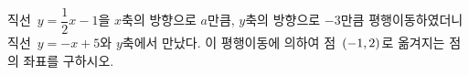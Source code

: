 직선~$y=\dfrac{1}{2}x-1$을 $x$축의 방향으로 $a$만큼, $y$축의 방향으로 $-3$만큼 평행이동하였더니 직선~$y=-x+5$와 $y$축에서 만났다. 이 평행이동에 의하여 점~$(-1{,}\mkern3mu\mathopen{}2)$로 옮겨지는 점의 좌표를 구하시오.
